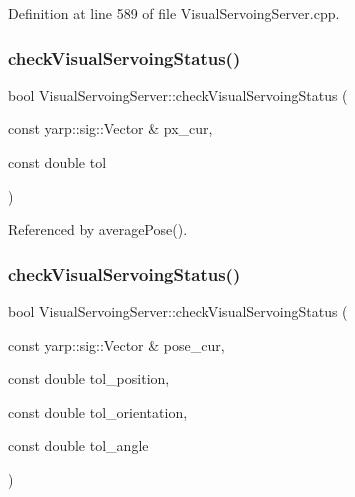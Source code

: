 Definition at line 589 of file Visual\+Servoing\+Server.\+cpp.

\mbox{\label{classVisualServoingServer_a6201a672d3efe497dd0114df50aee4d7}} 
\subsubsection{\texorpdfstring{check\+Visual\+Servoing\+Status()}{checkVisualServoingStatus()}\hspace{0.1cm}{\footnotesize\ttfamily [1/2]}}
{\footnotesize\ttfamily bool Visual\+Servoing\+Server\+::check\+Visual\+Servoing\+Status (\begin{DoxyParamCaption}\item[{const yarp\+::sig\+::\+Vector \&}]{px\+\_\+cur,  }\item[{const double}]{tol }\end{DoxyParamCaption})\hspace{0.3cm}{\ttfamily [private]}}



Referenced by average\+Pose().

\mbox{\label{classVisualServoingServer_afbcab623f48e3d2e648e144e22df4f19}} 
\subsubsection{\texorpdfstring{check\+Visual\+Servoing\+Status()}{checkVisualServoingStatus()}\hspace{0.1cm}{\footnotesize\ttfamily [2/2]}}
{\footnotesize\ttfamily bool Visual\+Servoing\+Server\+::check\+Visual\+Servoing\+Status (\begin{DoxyParamCaption}\item[{const yarp\+::sig\+::\+Vector \&}]{pose\+\_\+cur,  }\item[{const double}]{tol\+\_\+position,  }\item[{const double}]{tol\+\_\+orientation,  }\item[{const double}]{tol\+\_\+angle }\end{DoxyParamCaption})\hspace{0.3cm}{\ttfamily [private]}}

